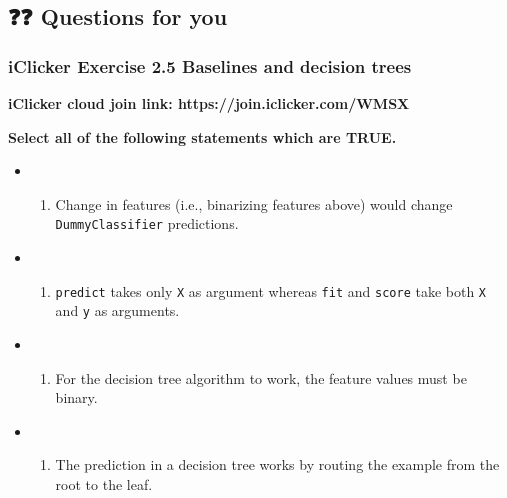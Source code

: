 \documentclass[11pt]{article}
\providecommand{\tightlist}{%
      \setlength{\itemsep}{0pt}\setlength{\parskip}{0pt}}
\begin{document}
    

    \subsection{❓❓ Questions for you}\label{questions-for-you}

    \subsubsection{iClicker Exercise 2.5 Baselines and decision
trees}\label{iclicker-exercise-2.5-baselines-and-decision-trees}

\textbf{iClicker cloud join link: https://join.iclicker.com/WMSX}

\textbf{Select all of the following statements which are TRUE.}

\begin{itemize}
\tightlist
\item
  \begin{enumerate}
  \def\labelenumi{(\Alph{enumi})}
  \tightlist
  \item
    Change in features (i.e., binarizing features above) would change
    \texttt{DummyClassifier} predictions.
  \end{enumerate}
\item
  \begin{enumerate}
  \def\labelenumi{(\Alph{enumi})}
  \setcounter{enumi}{1}
  \tightlist
  \item
    \texttt{predict} takes only \texttt{X} as argument whereas
    \texttt{fit} and \texttt{score} take both \texttt{X} and \texttt{y}
    as arguments.
  \end{enumerate}
\item
  \begin{enumerate}
  \def\labelenumi{(\Alph{enumi})}
  \setcounter{enumi}{2}
  \tightlist
  \item
    For the decision tree algorithm to work, the feature values must be
    binary.
  \end{enumerate}
\item
  \begin{enumerate}
  \def\labelenumi{(\Alph{enumi})}
  \setcounter{enumi}{3}
  \tightlist
  \item
    The prediction in a decision tree works by routing the example from
    the root to the leaf.
  \end{enumerate}
\end{itemize}

    
\end{document}
